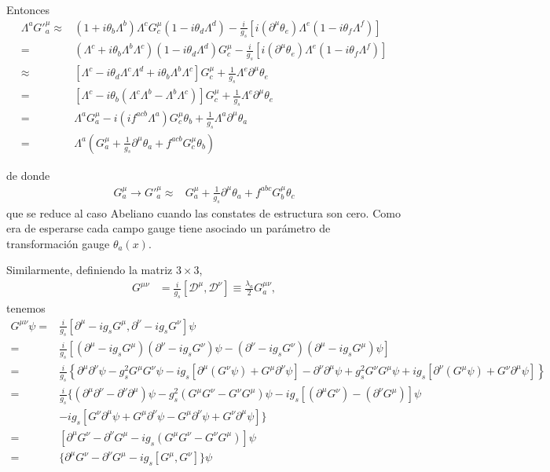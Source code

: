 Entonces
\begin{align}
\label{eq:Gmuinv}
  \Lambda^a{G'}^\mu_a\approx&(1+i\theta_b\Lambda^b)\Lambda^cG^\mu_c(1-i\theta_d\Lambda^d)-\frac{i}{g_s}[i(\partial^\mu\theta_e)\Lambda^e(1-i\theta_f\Lambda^f)]\nonumber\\
  =&(\Lambda^c+i\theta_b\Lambda^b\Lambda^c)(1-i\theta_d\Lambda^d)G^\mu_c-\frac{i}{g_s}[i(\partial^\mu\theta_e)\Lambda^e(1-i\theta_f\Lambda^f)]\nonumber\\
  \approx&[\Lambda^c-i\theta_d\Lambda^c\Lambda^d+i\theta_b\Lambda^b\Lambda^c]G^\mu_c+\frac{1}{g_s}\Lambda^e\partial^\mu\theta_e\nonumber\\
  =&[\Lambda^c-i\theta_b(\Lambda^c\Lambda^b-\Lambda^b\Lambda^c)]G^\mu_c+\frac{1}{g_s}\Lambda^e\partial^\mu\theta_e\nonumber\\
  =&\Lambda^aG^\mu_a-i(i f^{acb}\Lambda^a)G^\mu_c\theta_b+\frac{1}{g_s}\Lambda^a\partial^\mu\theta_a\nonumber\\
  =&\Lambda^a\left(G^\mu_a+\frac{1}{g_s}\partial^\mu\theta_a+f^{acb}G^\mu_c\theta_b\right)
\end{align}

de donde
\begin{align}
  \label{eq:gmutrinf}
  G^\mu_a\to {G'}^\mu_a\approx&G^\mu_a+\frac{1}{g_s}\partial^\mu\theta_a+f^{abc}G^\mu_b\theta_c
\end{align}
que se reduce al caso Abeliano cuando las constates de estructura son cero. Como era de esperarse cada campo gauge tiene asociado un parámetro de transformación gauge $\theta_a(x)$.




Similarmente, definiendo la matriz $3\times 3$, 
\begin{align}
  \label{eq:gmunu}
  {{G}}^{\mu\nu}&=\frac{i}{g_s}[\mathcal{D}^\mu,\mathcal{D}^\nu]\equiv\frac{\lambda_a}{2}G^{\mu\nu}_a,
\end{align}
tenemos
\begin{align}
  \label{eq:164qft}
   {G}^{\mu\nu}\psi =&\frac{i}{g_s}[\partial^\mu-ig_sG^\mu,\partial^\nu-ig_sG^\nu]\psi\nonumber\\
  =&\frac{i}{g_s}\left[\left(\partial^\mu-ig_sG^\mu\right)\left(\partial^\nu-ig_sG^\nu\right)\psi
    -\left(\partial^\nu-ig_sG^\nu\right)\left(\partial^\mu-ig_sG^\mu\right)\psi\right]\nonumber\\
  =&\frac{i}{g_s}\left\{\partial^\mu\partial^\nu\psi-g_s^2G^\mu G^\nu\psi-ig_s[\partial^\mu(G^\nu\psi)+G^\mu\partial^\nu\psi]
    -\partial^\nu\partial^\mu\psi+g_s^2G^\nu G^\mu\psi+ig_s[\partial^\nu(G^\mu\psi)+G^\nu\partial^\mu\psi]\right\}\nonumber\\
  =&\frac{i}{g_s}\{(\partial^\mu\partial^\nu-\partial^\nu\partial^\mu)\psi-g_s^2(G^\mu G^\nu-G^\nu G^\mu)\psi
  -ig_s[(\partial^\mu G^\nu)-(\partial^\nu G^\mu)]\psi\nonumber\\
  &-ig_s[G^\nu\partial^\mu\psi+G^\mu\partial^\nu\psi-G^\mu\partial^\nu\psi+G^\nu\partial^\mu\psi]\}\nonumber\\
=&[\partial^\mu G^\nu-\partial^\nu G^\mu-ig_s(G^\mu G^\nu-G^\nu G^\mu)]\psi\nonumber\\
=&\{\partial^\mu G^\nu-\partial^\nu G^\mu-ig_s[G^\mu,G^\nu]\}\psi
\end{align}

